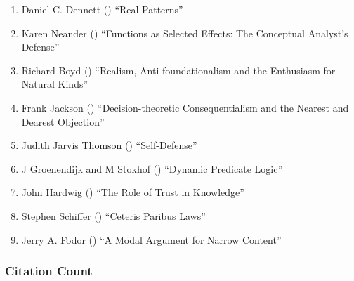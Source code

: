 \documentclass[
  10pt,
  letterpaper,
  DIV=11,
  numbers=noendperiod,
  twoside]{scrartcl}
\providecommand{\tightlist}{%
  \setlength{\itemsep}{0pt}\setlength{\parskip}{0pt}}\usepackage{longtable,booktabs,array}
\begin{document}
\begin{enumerate}
\def\labelenumi{\arabic{enumi}.}
\tightlist
\item
  Daniel C. Dennett () ``Real
  Patterns''
\item
  Karen Neander () ``Functions as
  Selected Effects: The Conceptual Analyst's Defense''
\item
  Richard Boyd () ``Realism,
  Anti-foundationalism and the Enthusiasm for Natural Kinds''
\item
  Frank Jackson ()
  ``Decision-theoretic Consequentialism and the Nearest and Dearest
  Objection''
\item
  Judith Jarvis Thomson ()
  ``Self-Defense''
\item
  J Groenendijk and M Stokhof ()
  ``Dynamic Predicate Logic''
\item
  John Hardwig () ``The Role of
  Trust in Knowledge''
\item
  Stephen Schiffer () ``Ceteris
  Paribus Laws''
\item
  Jerry A. Fodor () ``A Modal
  Argument for Narrow Content''
\end{enumerate}

\subsubsection*{Citation Count}\label{sec-count-1991}
\end{document}
